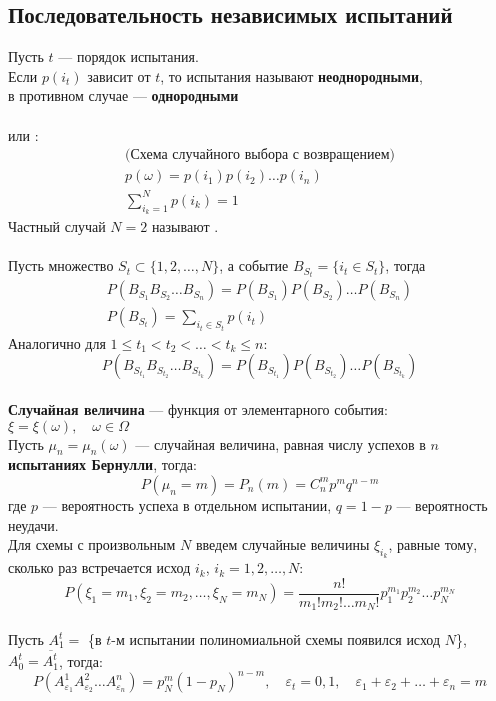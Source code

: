 \subsection{Последовательность независимых испытаний}
Пусть $t$ --- порядок испытания.\\
Если $p(i_t)$ зависит от $t$, то испытания называют \textbf{неоднородными},\\
в противном случае --- \textbf{однородными}\\
\\
или :
\begin{gather*}
    \text{(Схема случайного выбора с возвращением)}\\
    p(\omega) = p(i_1) p(i_2) \ldots p(i_n)\\
    \sum_{i_k=1}^N p(i_k) = 1
\end{gather*}
Частный случай $N = 2$ называют .\\
\\
Пусть множество $S_t \subset \{1, 2, \ldots, N\}$, а событие $B_{S_t} = \{i_t \in S_t\}$, тогда
\begin{gather*}
    P(B_{S_1} B_{S_2} \ldots B_{S_n}) = P(B_{S_1}) P(B_{S_2}) \ldots P(B_{S_n})\\
    P(B_{S_t}) = \sum_{i_t \in S_t} p(i_t)
\end{gather*}
Аналогично для $1 \le t_1 < t_2 < \ldots < t_k \le n$:
\begin{equation*}
    P(B_{S_{t_1}} B_{S_{t_2}} \ldots B_{S_{t_k}}) = P(B_{S_{t_1}}) P(B_{S_{t_2}}) \ldots P(B_{S_{t_k}})
\end{equation*}
\\
\textbf{Случайная величина} --- функция от элементарного события:\quad
$\xi = \xi(\omega), \quad \omega \in \Omega$\\
Пусть $\mu_n = \mu_n(\omega)$ --- случайная величина, равная числу успехов в $n$ \textbf{испытаниях Бернулли}, тогда:
\begin{equation*}
    P(\mu_n = m) = P_n(m) = C^m_n p^m q^{n-m}
\end{equation*}
где $p$ --- вероятность успеха в отдельном испытании, $q = 1 - p$ --- вероятность неудачи.\\
Для схемы с произвольным $N$ введем случайные величины $\xi_{i_k}$, равные тому, сколько раз встречается исход $i_k$,
$i_k = 1, 2, \ldots, N$:
\begin{equation*}
    P(\xi_1 = m_1, \xi_2 = m_2, \ldots, \xi_N = m_N) = \frac{n!}{m_1!m_2! \ldots m_N!} p_1^{m_1} p_2^{m_2} \ldots p_N^{m_N}
\end{equation*}
\\
Пусть $A^t_1 =$ \{в $t$-м испытании полиномиальной схемы появился исход $N$\}, $A^t_0 = \overline{A^t_1}$, тогда:
\begin{equation*}
    P(A^1_{\varepsilon_1} A^2_{\varepsilon_2} \ldots A^n_{\varepsilon_n}) = p^m_N (1 - p_N)^{n - m},
    \quad \varepsilon_t = 0,1, \quad \varepsilon_1 + \varepsilon_2 + \ldots + \varepsilon_n = m
\end{equation*}

